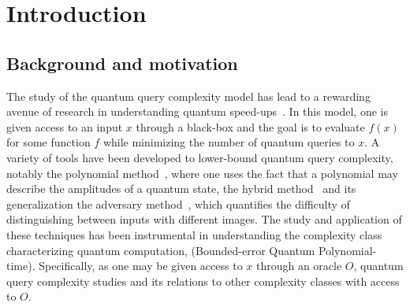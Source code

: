 











































\section{Introduction}

\subsection{Background and motivation}

The study of the quantum query complexity model has lead to a rewarding avenue of research in understanding quantum speed-ups~\cite{shor_algorithm, bbbv_97, polynomial_method, grover_algorithm}. In this model, one is given access to an input $x$ through a black-box and the goal is to evaluate $f(x)$ for some function $f$ while minimizing the number of quantum queries to $x$. A variety of tools have been developed to lower-bound quantum query complexity, notably the polynomial method~\cite{polynomial_method}, where one uses the fact that a polynomial may describe the amplitudes of a quantum state, the hybrid method~\cite{bbbv_97} and its generalization the adversary method~\cite{adversary_original, adversary_methods_equivalent}, which quantifies the difficulty of distinguishing between inputs with different images. The study and application of these techniques has been instrumental in understanding the complexity class characterizing quantum computation, \bqpname  (Bounded-error Quantum Polynomial-time). Specifically, as one may be given access to $x$ through an oracle $O$, quantum query complexity studies  and its relations to other complexity classes with access to $O$.

